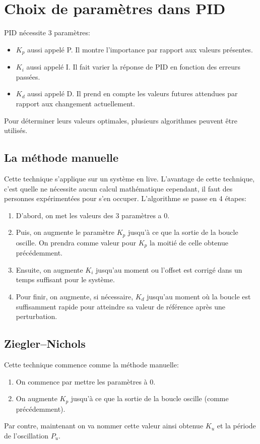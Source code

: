 \section{Choix de paramètres dans PID}
PID nécessite 3 paramètres:
\begin{itemize}
	\item $K_p$ aussi appelé P. Il montre l'importance par rapport aux valeurs présentes.
	\item $K_i$ aussi appelé I. Il fait varier la réponse de PID en fonction des erreurs passées.
	\item $K_d$ aussi appelé D. Il prend en compte les valeurs futures attendues par rapport aux changement actuellement.
\end{itemize}
Pour déterminer leurs valeurs optimales, plusieurs algorithmes peuvent être utilisés.

\subsection{La méthode manuelle}
Cette technique s'applique sur un système en live.
L'avantage de cette technique, c'est quelle ne nécessite aucun calcul mathématique cependant, il faut des personnes expérimentées pour s'en occuper.
L'algorithme se passe en 4 étapes:
\begin{enumerate}
	\item D'abord, on met les valeurs des 3 paramètres a 0.
	\item Puis, on augmente le paramètre $K_p$ jusqu'à ce que la sortie de la boucle oscille.
	On prendra comme valeur pour $K_p$ la moitié de celle obtenue précédemment.
	\item Ensuite, on augmente $K_i$ jusqu'au moment ou l'offset est corrigé dans un temps suffisant pour le système.
	\item Pour finir, on augmente, si nécessaire, $K_d$ jusqu'au moment où la boucle est suffisamment rapide pour atteindre sa valeur de référence après une perturbation.
\end{enumerate}

\subsection{Ziegler–Nichols}
Cette technique commence comme la méthode manuelle:
\begin{enumerate}
	\item On commence par mettre les paramètres à 0.
	\item On augmente $K_p$ jusqu'à ce que la sortie de la boucle oscille (comme précédemment).
\end{enumerate}
Par contre, maintenant on va nommer cette valeur ainsi obtenue $K_u$ et la période de l'oscillation $P_u$.

